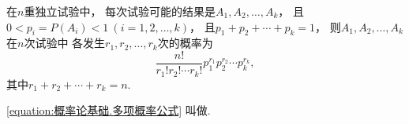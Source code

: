 \begin{theorem}[多项概率]
在\(n\)重独立试验中，
每次试验可能的结果是\(A_1,A_2,\dotsc,A_k\)，
且\(0 < p_i = P(A_i) < 1\ (i=1,2,\dotsc,k)\)，
且\(p_1+p_2+\dotsb+p_k=1\)，
则\(A_1,A_2,\dotsc,A_k\)在\(n\)次试验中
各发生\(r_1,r_2,\dotsc,r_k\)次的概率为
\begin{equation}\label{equation:概率论基础.多项概率公式}
	\frac{n!}{r_1! r_2! \dotsm r_k!}
	p_1^{r_1} p_2^{r_2} \dotsm p_k^{r_k},
\end{equation}
其中\(r_1+r_2+\dotsb+r_k=n\).
\end{theorem}
\cref{equation:概率论基础.多项概率公式}
叫做.
